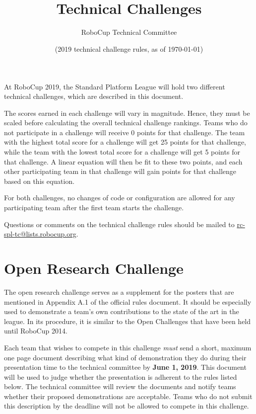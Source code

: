 \documentclass[12pt]{article}
\title{\leaguename\\Technical Challenges}
\author{RoboCup Technical Committee}
\date{(2019 technical challenge rules, as of \today)}
\begin{document}
\maketitle

At RoboCup 2019, the Standard Platform League will hold two different technical challenges, which are described in this document.

The scores earned in each challenge will vary in magnitude. Hence, they must be scaled before calculating the overall technical challenge rankings. Teams who do not participate in a challenge will receive 0 points for that challenge. The team with the highest total score for a challenge will get 25 points for that challenge, while the team with the lowest total score for a challenge will get 5 points for that challenge. A linear equation will then be fit to these two points, and each other participating team in that challenge will gain points for that challenge based on this equation.

For both challenges, no changes of code or configuration are allowed for any participating team after the first team starts the challenge.

Questions or comments on the technical challenge rules should be mailed to \url{rc-spl-tc@lists.robocup.org}.

\vfill
\tableofcontents
\setcounter{tocdepth}{3}
\thispagestyle{fancy}
\clearpage
\cfoot{\thepage}
\setcounter{page}{1}

\section{Open Research Challenge}

The open research challenge serves as a supplement for the posters that are mentioned in Appendix A.1 of the official rules document. It should be especially used to demonstrate a team's own contributions to the state of the art in the league. In its procedure, it is similar to the Open Challenges that have been held until RoboCup 2014.

Each team that wishes to compete in this challenge \emph{must} send a short, maximum one page document describing what kind of demonstration they do during their presentation time to the technical committee by \textbf{June 1, 2019}. This document will be used to judge whether the presentation is adherent to the rules listed below. The technical committee will review the documents and notify teams whether their proposed demonstrations are acceptable. Teams who do not submit this description by the deadline will not be allowed to compete in this challenge.
\end{document}

